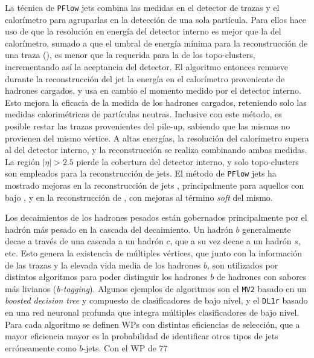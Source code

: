 La técnica de \texttt{PFlow} jets \cite{PERF-2015-09} combina las medidas en el detector de trazas y el calorímetro para agruparlas en la detección de una sola partícula. Para ellos hace uso de que la resolución en energía del detector interno es mejor que la del calorímetro, sumado a que el umbral de energía mínima para la reconstrucción de una traza (), es menor que la requerida para la de los topo-clusters, incrementando así la aceptancia del detector. El algoritmo entonces remueve durante la reconstrucción del jet la energía en el calorímetro proveniente de hadrones cargados, y usa en cambio el momento medido por el detector interno. Esto mejora la eficacia de la medida de los hadrones cargados, reteniendo solo las medidas calorimétricas de partículas neutras. Inclusive con este método, es posible restar las trazas provenientes del pile-up, sabiendo que las mismas no provienen del mismo vértice. A altas energías, la resolución del calorímetro supera al del detector interno, y la reconstrucción se realiza combinando ambas medidas. La región $|\eta|>2.5$ pierde la cobertura del detector interno, y solo topo-clusters son empleados para la reconstrucción de jets. El método de \texttt{PFlow} jets ha mostrado mejoras en la reconstrucción de jets \cite{PERF-2015-09}, principalmente para aquellos con bajo \pt, y en la reconstrucción de \met \cite{ATLAS-CONF-2018-023}, con mejoras al término \textit{soft} del mismo.




Los decaimientos de los hadrones pesados están gobernados principalmente por el hadrón más pesado en la cascada del decaimiento. Un hadrón $b$ generalmente decae a través de una cascada a un hadrón $c$, que a su vez decae a un hadrón $s$, etc. Esto genera la existencia de múltiples 
vértices, que junto con la información de las trazas y la elevada vida media de los hadrones $b$, son utilizados por distintos algoritmos para poder distinguir los hadrones $b$ de hadrones con sabores más livianos (\textit{b-tagging}). Algunos ejemplos de algoritmos \cite{FTAG-2018-01} son el \texttt{MV2} basado en un \textit{boosted decision tree} y compuesto de clasificadores de bajo nivel, y el \texttt{DL1r} \cite{FTAG-2018-01, ATL-PHYS-PUB-2020-009} basado en una red neuronal profunda que integra múltiples clasificadores de bajo nivel. Para cada algoritmo se definen WPs con distintas eficiencias de selección, que a mayor eficiencia mayor es la probabilidad de identificar otros tipos de jets erróneamente como $b$-jets. Con el WP de 77


